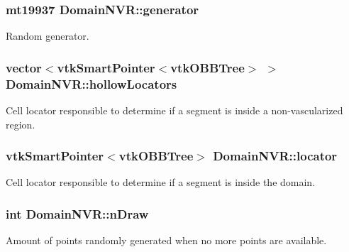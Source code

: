 \subsubsection[{\texorpdfstring{generator}{generator}}]{\setlength{\rightskip}{0pt plus 5cm}mt19937 Domain\+N\+V\+R\+::generator\hspace{0.3cm}{\ttfamily [private]}}\hypertarget{class_domain_n_v_r_a0b5be1fa94ce69a9af453274122b8387}{}\label{class_domain_n_v_r_a0b5be1fa94ce69a9af453274122b8387}
Random generator. 
\subsubsection[{\texorpdfstring{hollow\+Locators}{hollowLocators}}]{\setlength{\rightskip}{0pt plus 5cm}vector$<$vtk\+Smart\+Pointer$<$vtk\+O\+B\+B\+Tree$>$ $>$ Domain\+N\+V\+R\+::hollow\+Locators\hspace{0.3cm}{\ttfamily [private]}}\hypertarget{class_domain_n_v_r_a8848ec8d5e22bb9d03bd946087f0fa00}{}\label{class_domain_n_v_r_a8848ec8d5e22bb9d03bd946087f0fa00}
Cell locator responsible to determine if a segment is inside a non-\/vascularized region. 
\subsubsection[{\texorpdfstring{locator}{locator}}]{\setlength{\rightskip}{0pt plus 5cm}vtk\+Smart\+Pointer$<$vtk\+O\+B\+B\+Tree$>$ Domain\+N\+V\+R\+::locator\hspace{0.3cm}{\ttfamily [private]}}\hypertarget{class_domain_n_v_r_a3352f4af5dcc9c78cf2a56fd720da497}{}\label{class_domain_n_v_r_a3352f4af5dcc9c78cf2a56fd720da497}
Cell locator responsible to determine if a segment is inside the domain. 
\subsubsection[{\texorpdfstring{n\+Draw}{nDraw}}]{\setlength{\rightskip}{0pt plus 5cm}int Domain\+N\+V\+R\+::n\+Draw\hspace{0.3cm}{\ttfamily [private]}}\hypertarget{class_domain_n_v_r_aa8a3d85f1a554c27e0ca399924576822}{}\label{class_domain_n_v_r_aa8a3d85f1a554c27e0ca399924576822}
Amount of points randomly generated when no more points are available. 
